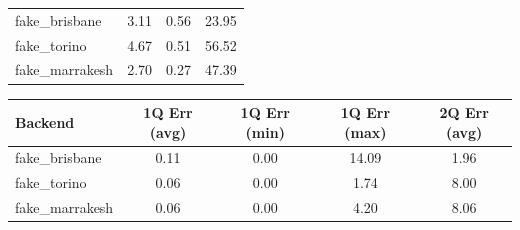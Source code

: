 \documentclass{iopjournal}
\begin{document}
\begin{table}[htbp]
\begin{center}
\begin{tabular}{lccc}
fake\_brisbane  & 3.11 & 0.56 & 23.95 \\
fake\_torino    & 4.67 & 0.51 & 56.52 \\
fake\_marrakesh & 2.70 & 0.27 & 47.39 \\

\hline
\end{tabular}

\vspace{0.6em}

\begin{tabular}{lcccc}
\hline
\textbf{Backend} & \textbf{1Q Err (avg)} & \textbf{1Q Err (min)} & \textbf{1Q Err (max)} & \textbf{2Q Err (avg)} \\
\hline

fake\_brisbane  & 0.11 & 0.00 & 14.09 & 1.96 \\
fake\_torino    & 0.06 & 0.00 & 1.74  & 8.00 \\
fake\_marrakesh & 0.06 & 0.00 & 4.20  & 8.06 \\

\hline
\end{tabular}

\end{center}

\end{table}
\end{document}
